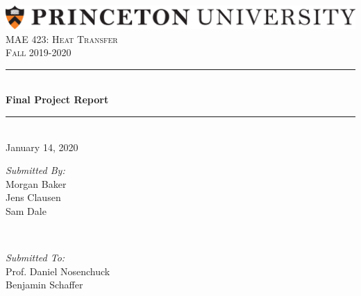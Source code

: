 

%

\begin{titlepage}

\newcommand{\HRule}{\rule{\linewidth}{0.5mm}} %

\center %
 
\includegraphics[width=\columnwidth]{images/PU1linehighres.png}\\[1.5cm]
\textsc{\Large MAE 423: Heat Transfer}\\[0.5cm] %
\textsc{\large Fall 2019-2020}\\[1.5cm] %


\HRule \\[0.6cm]
{ \huge \bfseries Final Project Report}\\[0.4cm] %
\HRule \\[2cm]

{\Large January 14, 2020}\\[3cm] %

 

\begin{minipage}[t]{0.4\textwidth}
\begin{flushleft} \large
\emph{Submitted By:}\\
Morgan Baker\\
Jens Clausen\\
Sam Dale\\
\end{flushleft}
\end{minipage}
~
\begin{minipage}[t]{0.4\textwidth}
\begin{flushright} \large
\emph{Submitted To:} \\
Prof. Daniel Nosenchuck\\
Benjamin Schaffer\\
\end{flushright}
\end{minipage}\\[1cm]

\vfill %

\end{titlepage}


%